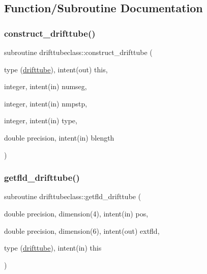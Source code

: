 \subsection{Function/\+Subroutine Documentation}
\mbox{\label{namespacedrifttubeclass_a322f55e58fbe6fb5e4ed93cd126e5ede}} 
\subsubsection{\texorpdfstring{construct\_drifttube()}{construct\_drifttube()}}
{\footnotesize\ttfamily subroutine drifttubeclass\+::construct\+\_\+drifttube (\begin{DoxyParamCaption}\item[{type (\mbox{\hyperlink{namespacedrifttubeclass_structdrifttubeclass_1_1drifttube}{drifttube}}), intent(out)}]{this,  }\item[{integer, intent(in)}]{numseg,  }\item[{integer, intent(in)}]{nmpstp,  }\item[{integer, intent(in)}]{type,  }\item[{double precision, intent(in)}]{blength }\end{DoxyParamCaption})}

\mbox{\label{namespacedrifttubeclass_aa903101ae6943402917a2f29a8aa67d3}} 
\subsubsection{\texorpdfstring{getfld\_drifttube()}{getfld\_drifttube()}}
{\footnotesize\ttfamily subroutine drifttubeclass\+::getfld\+\_\+drifttube (\begin{DoxyParamCaption}\item[{double precision, dimension(4), intent(in)}]{pos,  }\item[{double precision, dimension(6), intent(out)}]{extfld,  }\item[{type (\mbox{\hyperlink{namespacedrifttubeclass_structdrifttubeclass_1_1drifttube}{drifttube}}), intent(in)}]{this }\end{DoxyParamCaption})}

